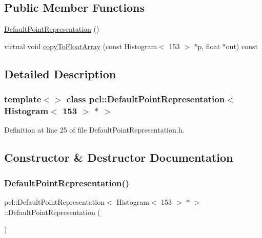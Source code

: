 \subsection*{Public Member Functions}
\begin{DoxyCompactItemize}
\item 
\hyperlink{classpcl_1_1_default_point_representation_3_01_histogram_3_01153_01_4_01_5_01_4_a7c00daa641cce7da6ab0ff49e248b351}{Default\+Point\+Representation} ()
\item 
virtual void \hyperlink{classpcl_1_1_default_point_representation_3_01_histogram_3_01153_01_4_01_5_01_4_af9596e041f0502152f0e2673f9f2358d}{copy\+To\+Float\+Array} (const Histogram$<$ 153 $>$ $\ast$p, float $\ast$out) const
\end{DoxyCompactItemize}


\subsection{Detailed Description}
\subsubsection*{template$<$$>$\newline
class pcl\+::\+Default\+Point\+Representation$<$ Histogram$<$ 153 $>$ $\ast$ $>$}



Definition at line 25 of file Default\+Point\+Representation.\+h.



\subsection{Constructor \& Destructor Documentation}
\mbox{\label{classpcl_1_1_default_point_representation_3_01_histogram_3_01153_01_4_01_5_01_4_a7c00daa641cce7da6ab0ff49e248b351}} 
\subsubsection{\texorpdfstring{Default\+Point\+Representation()}{DefaultPointRepresentation()}}
{\footnotesize\ttfamily pcl\+::\+Default\+Point\+Representation$<$ Histogram$<$ 153 $>$ $\ast$ $>$\+::Default\+Point\+Representation (\begin{DoxyParamCaption}{ }\end{DoxyParamCaption})\hspace{0.3cm}{\ttfamily [inline]}}



